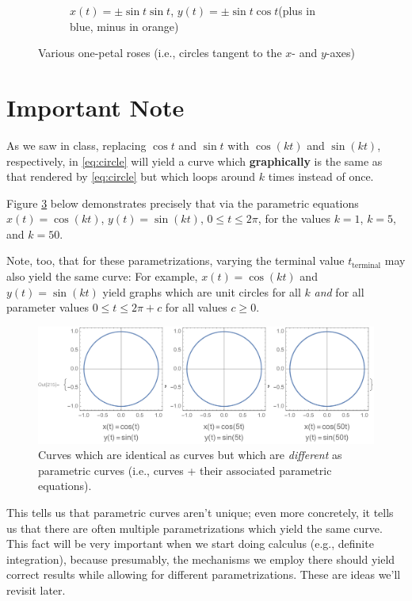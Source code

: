 \documentclass[12pt]{article}
\begin{document}
\begin{figure}[h!]
\begin{subfigure}[t]{0.5\textwidth}
			\caption{$x(t)=\pm\sin{t}\sin{t}$, $y(t)=\pm\sin{t}\cos{t}$\newline(plus in blue, minus in orange)}
			\label{subfig:roses4}
		\end{subfigure}
		\caption{Various one-petal roses (i.e., circles tangent to the $x$- and $y$-axes)}
		\label{fig:roses2}
	\end{figure}
	
	\section*{Important Note}
	As we saw in class, replacing $\cos{t}$ and $\sin{t}$ with $\cos(kt)$ and $\sin(kt)$, respectively, in \eqref{eq:circle} will yield a curve which \textbf{graphically} is the same as that rendered by \eqref{eq:circle} but which loops around $k$ times instead of once. 
	
	Figure \ref{fig:k} below demonstrates precisely that via the parametric equations $x(t)=\cos(kt)$, $y(t)=\sin(kt)$, $0\leq t\leq 2\pi$, for the values $k=1$, $k=5$, and $k=50$. 
	
	Note, too, that for these parametrizations, varying the terminal value $t_{\text{terminal}}$ may also yield the same curve: For example, $x(t)=\cos(kt)$ and $y(t)=\sin(kt)$ yield graphs which are unit circles for all $k$ \textit{and} for all parameter values $0\leq t\leq 2\pi+c$ for all values $c\geq 0$.
	\begin{figure}[h!]
		\begin{center}
			\includegraphics[trim={20mm 0 2mm -6mm}, clip, scale=0.75]{8_Misc}
			\caption{Curves which are identical as curves but which are \textit{different} as parametric curves (i.e., curves + their associated parametric equations).}
			\label{fig:k}
		\end{center}
	\end{figure}
	
	This tells us that parametric curves aren't unique; even more concretely, it tells us that there are often multiple parametrizations which yield the same curve. This fact will be very important when we start doing calculus (e.g., definite integration), because presumably, the mechanisms we employ there should yield correct results while allowing for different parametrizations. These are ideas we'll revisit later.
	
\end{document}
